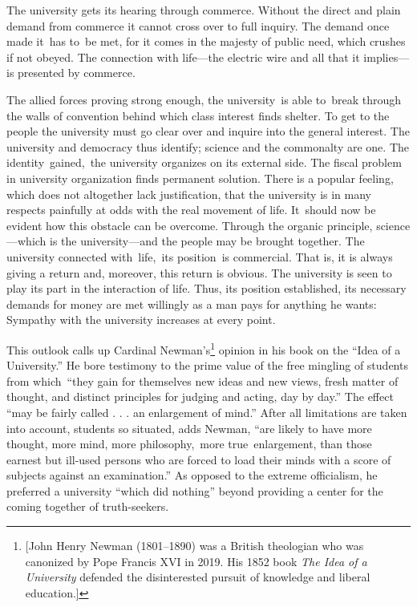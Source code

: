 \documentclass[twoside,symmetric,nobib,justified]{tufte-book}
\begin{document}
The university gets its hearing through commerce. Without the direct and
plain demand from commerce it cannot cross over to full inquiry. The
demand once made it~has to~be met, for it comes in the majesty of public
need, which crushes if not obeyed. The connection with life---the
electric wire and all that it implies---is presented by commerce.~

The allied forces proving strong enough, the university~is able to~break
through the walls of convention behind which class interest finds
shelter. To get to the people the university must go clear over and
inquire into the general interest. The university and democracy thus
identify; science and the commonalty are one. The identity~gained,~the
university organizes on its external side. The fiscal problem in
university organization finds permanent solution. There is a popular
feeling, which does not altogether lack justification, that the
university is in many respects painfully at odds with the real movement
of life. It~should now be evident how this obstacle can be overcome.
Through the organic principle, science---which is the university---and
the people may be brought together. The university connected
with~life,~its position~is commercial. That is, it is always giving a
return and, moreover, this return is obvious. The university is seen to
play its part in the interaction of life. Thus, its position
established, its necessary demands for money are met willingly as a man
pays for anything he wants: Sympathy with the university increases at
every point.~

This outlook calls up Cardinal Newman's\footnote{{[}John Henry Newman
  (1801--1890) was a British theologian who was canonized by Pope
  Francis XVI in 2019. His 1852 book \emph{The Idea of a University}
  defended the disinterested pursuit of knowledge and liberal
  education.\href{applewebdata://D02306DF-3E46-4684-BD1A-1A323FFB2CB2\#_msocom_1}{{]}}}
opinion in his book on the ``Idea of a University.'' He bore testimony
to the prime value of the free mingling of students from which~``they
gain for themselves new ideas and new views, fresh matter of thought,
and distinct principles for judging and acting, day by day.'' The effect
``may be fairly called . . . an enlargement of mind.'' After all
limitations are taken into account, students so situated, adds Newman,
``are likely to have more thought, more mind, more philosophy,~more
true~enlargement, than those earnest but ill-used persons who are forced
to load their minds with a score of subjects against an examination.''
As opposed to the extreme officialism, he preferred a university ``which
did nothing'' beyond providing a center for the coming together of
truth-seekers.~
\end{document}
